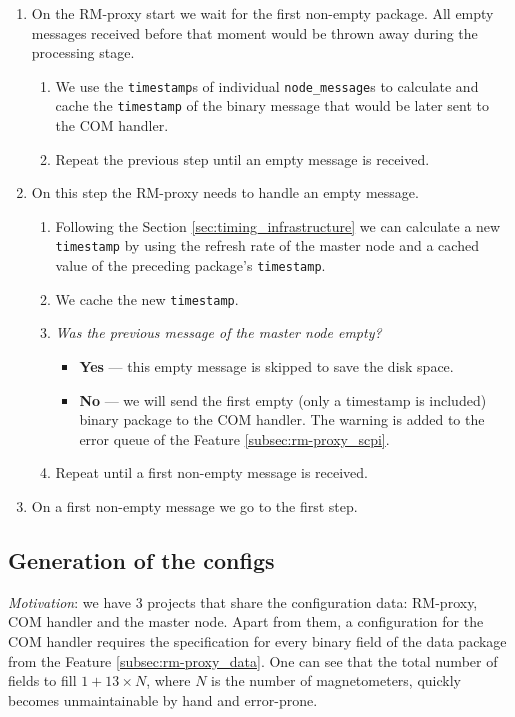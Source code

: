 \begin{enumerate}
	\item{
		On the RM-proxy start we wait for the first non-empty package. All empty messages received before that moment would be thrown away during the processing stage.
		\begin{enumerate}
			\item We use the \texttt{timestamp}s of individual \texttt{node\_message}s to calculate and cache the \texttt{timestamp} of the binary message that would be later sent to the COM handler.
			\item Repeat the previous step until an empty message is received.
		\end{enumerate}
	}
	\item{
		On this step the RM-proxy needs to handle an empty message.
		\begin{enumerate}
			\item Following the Section \ref{sec:timing_infrastructure} we can calculate a new \texttt{timestamp} by using the refresh rate of the master node and a cached value of the preceding package's \texttt{timestamp}.
			\item We cache the new \texttt{timestamp}.
			\item{
				\textit{Was the previous message of the master node empty?}
				\begin{itemize}
					\item \textbf{Yes} --- this empty message is skipped to save the disk space.
					\item \textbf{No} --- we will send the first empty (only a timestamp is included) binary package to the COM handler. The warning is added to the error queue of the Feature \ref{subsec:rm-proxy_scpi}.
				\end{itemize}
			}
			\item Repeat until a first non-empty message is received.
		\end{enumerate}
	}
	\item On a first non-empty message we go to the first step.
\end{enumerate}

\subsection{Generation of the configs}
\label{subsec:rm-proxy_configs}

\textit{Motivation}: we have 3 projects that share the configuration data: RM-proxy, COM handler and the master node. Apart from them, a configuration for the COM handler requires the specification for every binary field of the data package from the Feature \ref{subsec:rm-proxy_data}. One can see that the total number of fields to fill $1 + 13 \times N$, where $N$ is the number of magnetometers, quickly becomes unmaintainable by hand and error-prone.

